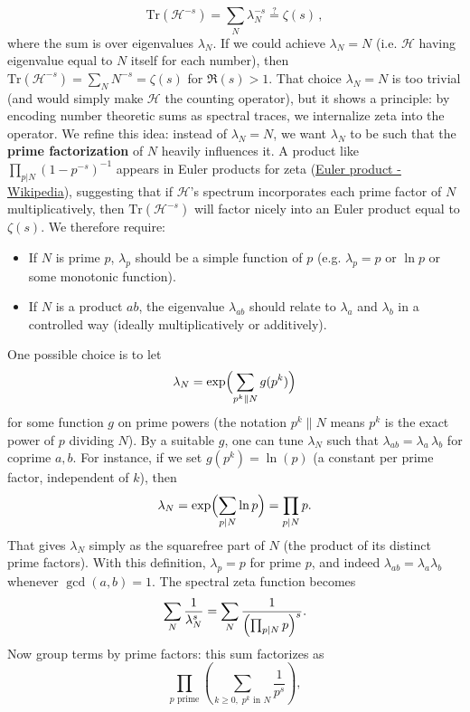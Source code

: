\documentclass{article}
\begin{document}
$$
\mathrm{Tr}(\mathcal{H}^{-s}) = \sum_{N} \lambda_N^{-s} \stackrel{?}{=} \zeta(s)\,,
$$
where the sum is over eigenvalues $\lambda_N$. If we could achieve $\lambda_N = N$ (i.e. $\mathcal{H}$ having eigenvalue equal to $N$ itself for each number), then $\mathrm{Tr}(\mathcal{H}^{-s}) = \sum_N N^{-s} = \zeta(s)$ for $\Re(s)>1$. That choice $\lambda_N=N$ is too trivial (and would simply make $\mathcal{H}$ the counting operator), but it shows a principle: by encoding number theoretic sums as spectral traces, we internalize zeta into the operator. We refine this idea: instead of $\lambda_N=N$, we want $\lambda_N$ to be such that the \textbf{prime factorization} of $N$ heavily influences it. A product like $\prod_{p|N}(1 - p^{-s})^{-1}$ appears in Euler products for zeta (\href{https://en.wikipedia.org/wiki/Euler_product#:~:text=The%20Euler%20product%20attached%20to,of%20the%20geometric%20series%2C%20is}{Euler product - Wikipedia}), suggesting that if $\mathcal{H}$'s spectrum incorporates each prime factor of $N$ multiplicatively, then $\mathrm{Tr}(\mathcal{H}^{-s})$ will factor nicely into an Euler product equal to $\zeta(s)$. We therefore require:
\begin{itemize}[leftmargin=*, label={--}]
\item If $N$ is prime $p$, $\lambda_p$ should be a simple function of $p$ (e.g. $\lambda_p = p$ or $\ln p$ or some monotonic function).
\item If $N$ is a product $ab$, the eigenvalue $\lambda_{ab}$ should relate to $\lambda_a$ and $\lambda_b$ in a controlled way (ideally multiplicatively or additively).
\end{itemize}
One possible choice is to let
$$
\lambda_N = \exp\Bigl(\sum_{p^k \parallel N} g(p^k)\Bigr)
$$
for some function $g$ on prime powers (the notation $p^k \parallel N$ means $p^k$ is the exact power of $p$ dividing $N$). By a suitable $g$, one can tune $\lambda_N$ such that $\lambda_{ab} = \lambda_a\,\lambda_b$ for coprime $a,b$. For instance, if we set $g(p^k) = \ln(p)$ (a constant per prime factor, independent of $k$), then 
$$
\lambda_N = \exp\Bigl(\sum_{p|N}\ln p\Bigr) = \prod_{p|N} p.
$$
That gives $\lambda_N$ simply as the squarefree part of $N$ (the product of its distinct prime factors). With this definition, $\lambda_p = p$ for prime $p$, and indeed $\lambda_{ab} = \lambda_a \lambda_b$ whenever $\gcd(a,b)=1$. The spectral zeta function becomes 
$$
\sum_N \frac{1}{\lambda_N^s} = \sum_{N} \frac{1}{\Bigl(\prod_{p|N} p\Bigr)^{s}}.
$$
Now group terms by prime factors: this sum factorizes as 
$$
\prod_{p\text{ prime}} \left( \sum_{k\ge0,\;p^k \text{ in } N} \frac{1}{p^s} \right),
$$
\end{document}
